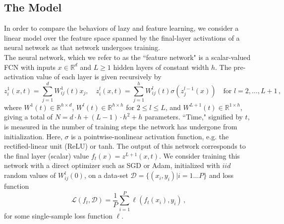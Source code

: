 \documentclass[11pt]{article}
\begin{document}
\subsection{The Model}

In order to compare the behaviors of lazy and feature learning, we consider a linear model over the feature space spanned by the final-layer activations of a neural network as that network undergoes training.\\

The neural network, which we refer to as the ``feature network" is a scalar-valued FCN with inputs $x\in \mathbb R^d$ and $L \geq  1$ hidden layers of constant width $h$. The pre-activation value of each layer is given recursively by
\begin{equation}
    z^1_i(x, t) = \sum_{j=1}^d W^1_{ij}(t)x_j, \quad
    z^l_i(x, t) = \sum_{j=1}^h W^l_{ij}(t)\sigma(z^{l-1}_j(x)) \quad \text{for } l = 2,\ldots, L+1 \,,
\end{equation}
where $W^1(t) \in \mathbb R^{h\times d}$, $W^l(t) \in \mathbb R^{h\times h}$ for $2\leq l \leq L$, and $W^{L+1}(t) \in \mathbb R^{1 \times h}$, giving a total of $N = d\cdot h + (L-1)\cdot h^2 + h$ parameters. ``Time," signified by $t$, is measured in the number of training steps the network has undergone from initialization. Here, $\sigma$ is a pointwise-nonlinear activation function, e.g. the rectified-linear unit (ReLU) or tanh. The output of this network corresponds to the final layer (scalar) value $f_t(x) = z^{L+1}(x, t)$. We consider training this network with a direct optimizer such as SGD or Adam, initialized with $iid$ random values of $W^l_{ij}(0)$, on a data-set $\mathcal D = \{(x_i, y_i) | i = 1\ldots P\}$ and loss function
\begin{equation}
    \mathcal L (f_t, \mathcal D) = \frac{1}{P}\sum_{i=1}^P \ell (f_t(x_i), y_i)\,,
    \label{loss_function}
\end{equation}
for some single-sample loss function $\ell$.\\ 
\end{document}
